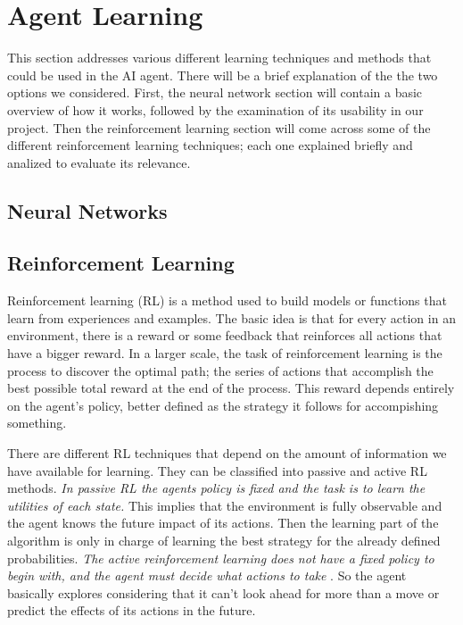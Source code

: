 \section{Agent Learning}\label{agent_learning}
This section addresses various different learning techniques and methods that could be used in the AI agent. There will be a brief explanation of the the two options we considered. First, the neural network section will contain a basic overview of how it works, followed by the examination of its usability in our project. Then the reinforcement learning section will come across some of the different reinforcement learning techniques;  each one explained briefly and analized to evaluate its relevance. 

\subsection*{Neural Networks}			 


\subsection*{Reinforcement Learning}

Reinforcement learning (RL) is a method used to build models or functions that learn from experiences and examples. The basic idea is that for every action in an environment, there is a reward or some feedback that reinforces all actions that have a bigger reward. In a larger scale, the task of reinforcement learning is the process to discover the optimal path; the series of actions that accomplish the best possible total reward at the end of the process. This reward depends entirely on the agent's policy, better defined as the strategy it follows for accompishing something. 

There are different RL techniques that depend on the amount of information we have available for learning. They can be classified into passive and active RL methods. \textit{In passive RL the agents policy is fixed and the task is to learn the utilities of each state.} \cite[p764]{rl} This implies that the environment is fully observable and the agent knows the future impact of its actions. Then the learning part of the algorithm is only in charge of learning the best strategy for the already defined probabilities. \textit{The active reinforcement learning does not have a fixed policy to begin with, and the agent must decide what actions to take} \cite[p771]{rl}. So the agent basically explores considering that it can't look ahead for more than a move or predict the effects of its actions in the future.

